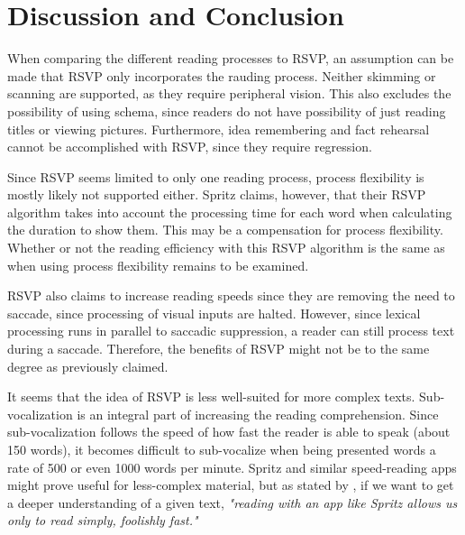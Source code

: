 \section{Discussion and Conclusion}
When comparing the different reading processes to RSVP, an assumption can be made that RSVP only incorporates the rauding process. Neither skimming or scanning are supported, as they require peripheral vision. This also excludes the possibility of using schema, since readers do not have possibility of just reading titles or viewing pictures. Furthermore, idea remembering and fact rehearsal cannot be accomplished with RSVP, since they require regression. 

Since RSVP seems limited to only one reading process, process flexibility is mostly likely not supported either. Spritz claims, however, that their RSVP algorithm takes into account the processing time for each word when calculating the duration to show them. This may be a compensation for process flexibility. Whether or not the reading efficiency with this RSVP algorithm is the same as when using process flexibility remains to be examined.

RSVP also claims to increase reading speeds since they are removing the need to saccade, since processing of visual inputs are halted. However, since lexical processing runs in parallel 
to saccadic suppression, a reader can still process text during a saccade. Therefore, the benefits of RSVP might not be to the same degree as previously claimed.

It seems that the idea of RSVP is less well-suited for more complex texts. Sub-vocalization is an integral part of increasing the reading comprehension. Since sub-vocalization follows the speed of how fast the reader is able to speak (about 150 words), it becomes difficult to sub-vocalize when being presented words a rate of 500 or even 1000 words per minute. Spritz and similar speed-reading apps might prove useful for less-complex material, but as stated by , if we want to get a deeper understanding of a given text, \emph{"reading with an app like Spritz allows us only to read simply, foolishly fast."}

